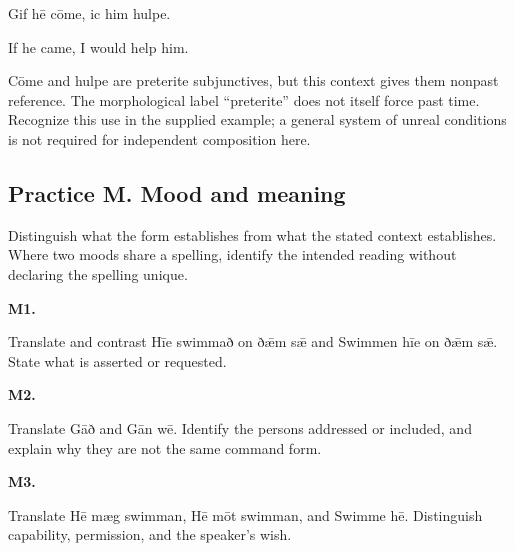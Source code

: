 Gif hē cōme, ic him hulpe.

If he came, I would help him.

Cōme and hulpe are preterite subjunctives, but this context gives them nonpast reference. The morphological label “preterite” does not itself force past time. Recognize this use in the supplied example; a general system of unreal conditions is not required for independent composition here.

\subsection*{Practice M. Mood and meaning}

Distinguish what the form establishes from what the stated context establishes. Where two moods share a spelling, identify the intended reading without declaring the spelling unique.

\par\begin{minipage}{\linewidth}\raggedright
\textbf{M1.}

Translate and contrast Hīe swimmað on ðǣm sǣ and Swimmen hīe on ðǣm sǣ. State what is asserted or requested.

\end{minipage}\par\addvspace{4pt}

\par\begin{minipage}{\linewidth}\raggedright
\textbf{M2.}

Translate Gāð and Gān wē. Identify the persons addressed or included, and explain why they are not the same command form.

\end{minipage}\par\addvspace{4pt}

\par\begin{minipage}{\linewidth}\raggedright
\textbf{M3.}

Translate Hē mæg swimman, Hē mōt swimman, and Swimme hē. Distinguish capability, permission, and the speaker’s wish.

\end{minipage}\par\addvspace{4pt}

